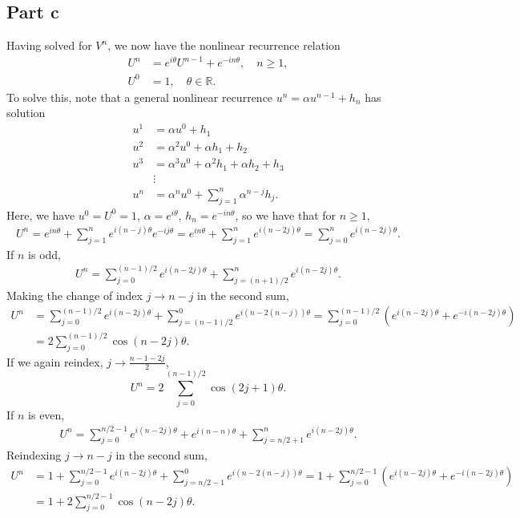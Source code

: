 \documentclass{article}
\begin{document}
\subsection{Part c}
Having solved for $V^n$, we now have the nonlinear recurrence relation 
\begin{align*}
	U^{n}&=e^{i\theta}U^{n-1}+e^{-in\theta}, \quad n \geq 1,\\
	U^0 &= 1, \quad \theta \in \mathbb R.
\end{align*}
To solve this, note that a general nonlinear recurrence $u^n=\alpha u^{n-1}+h_n$ has solution
\begin{align*}
u^1&=\alpha u^0+h_1\\
u^2&=\alpha^2u^0+\alpha h_1+h_2\\
u^3&= \alpha^3u^0+\alpha^2 h_1+\alpha h_2+h_3\\
&\vdots\\
u^n&=\alpha^n u^0+\sum_{j=1}^{n}\alpha^{n-j}h_{j}.
\end{align*}
Here, we have $u^0=U^0=1$, $\alpha=e^{i\theta}$, $h_n=e^{-in\theta}$, so we have that for $n\geq1$, 
\begin{align*}
U^n=e^{in\theta}+\sum_{j=1}^{n}e^{i(n-j)\theta}e^{-ij\theta}=e^{in\theta}+\sum_{j=1}^{n}e^{i(n-2j)\theta}=\sum_{j=0}^{n}e^{i(n-2j)\theta}.
\end{align*}
If $n$ is odd,
\begin{align*}
U^n=\sum_{j=0}^{(n-1)/2}e^{i(n-2j)\theta}+\sum_{j=(n+1)/2}^{n}e^{i(n-2j)\theta}.
\end{align*}
Making the change of index $j\to n-j$ in the second sum,
\begin{align*}
	U^n&=\sum_{j=0}^{(n-1)/2}e^{i(n-2j)\theta}+\sum_{j=(n-1)/2}^{0}e^{i(n-2(n-j))\theta}=\sum_{j=0}^{(n-1)/2}(e^{i(n-2j)\theta}+e^{-i(n-2j)\theta})\\&=
	2\sum_{j=0}^{(n-1)/2}\cos(n-2j)\theta. 
\end{align*}
If we again reindex, $j\to \frac{n-1-2j}{2}$,
\[
U^n=2\sum_{j=0}^{(n-1)/2}\cos(2j+1)\theta.
\]
If $n$ is even, 
\begin{align*}
	U^n=\sum_{j=0}^{n/2-1}e^{i(n-2j)\theta}+e^{i(n-n)\theta}+\sum_{j=n/2+1}^{n}e^{i(n-2j)\theta}.
\end{align*}
Reindexing $j\to n-j$ in the second sum,
\begin{align*}
	U^n&=1+\sum_{j=0}^{n/2-1}e^{i(n-2j)\theta}+\sum_{j=n/2-1}^{0}e^{i(n-2(n-j))\theta}=1+\sum_{j=0}^{n/2-1}(e^{i(n-2j)\theta}+e^{-i(n-2j)\theta})\\&=
	1+2\sum_{j=0}^{n/2-1}\cos(n-2j)\theta. 
\end{align*}
\end{document}
